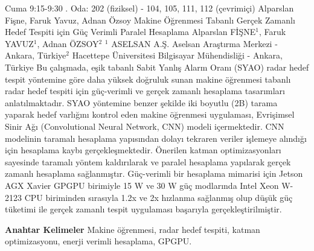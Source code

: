 
    \begin{abstract_basarim}
    {Cuma 9:15-9:30}
    {.}
    {Oda: 202 (fiziksel) - 104, 105, 111, 112 (çevrimiçi)}
    {Alparslan Fişne, Faruk Yavuz, Adnan Özsoy}
    {Makine Öğrenmesi Tabanlı Gerçek Zamanlı Hedef Tespiti için Güç Verimli Paralel Hesaplama}
    {%
    Alparslan FİŞNE$^{1}$, Faruk YAVUZ$^{1}$, Adnan ÖZSOY$^{2}$}
    {%
    }
    {%
    $^1$ ASELSAN A.Ş. Aselsan Araştırma Merkezi - Ankara, Türkiye\newline{}$^2$ Hacettepe Üniversitesi Bilgisayar Mühendisliği - Ankara, Türkiye}
    Bu çalışmada, eşik tabanlı Sabit Yanlış Alarm Oranı (SYAO) radar hedef tespit yöntemine göre daha yüksek doğruluk sunan makine öğrenmesi tabanlı radar hedef tespiti için güç-verimli ve gerçek zamanlı hesaplama tasarımları anlatılmaktadır. SYAO yöntemine benzer şekilde iki boyutlu (2B) tarama yaparak hedef varlığını kontrol eden makine öğrenmesi uygulaması, Evrişimsel Sinir Ağı (Convolutional Neural Network, CNN) modeli içermektedir. CNN modelinin taramalı hesaplama yapısından dolayı tekraren veriler işlemeye alındığı için hesaplama kaybı gerçekleşmektedir. Önerilen katman optimizasyonları sayesinde taramalı yöntem kaldırılarak ve paralel hesaplama yapılarak gerçek zamanlı hesaplama sağlanmıştır. Güç-verimli bir hesaplama mimarisi için Jetson AGX Xavier GPGPU birimiyle 15 W ve 30 W güç modlarında Intel Xeon W-2123 CPU biriminden sırasıyla 1.2x ve 2x hızlanma sağlanmış olup düşük güç tüketimi ile gerçek zamanlı tespit uygulaması başarıyla gerçekleştirilmiştir. 
    
            \textbf{Anahtar Kelimeler} \newline{}Makine öğrenmesi, radar hedef tespiti, katman optimizasyonu, enerji verimli hesaplama, GPGPU.
    \end{abstract_basarim}
    